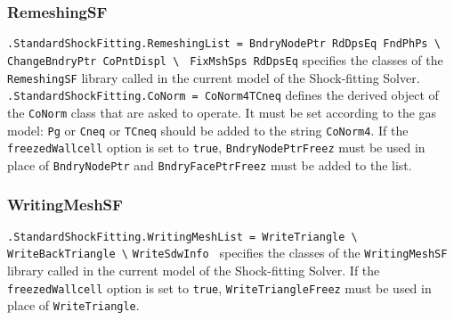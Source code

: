 \documentclass[11pt,a4paper,oneside]{article}
\begin{document}
\subsubsection*{RemeshingSF}

\hspace*{1cm} \texttt{.StandardShockFitting.RemeshingList = BndryNodePtr RdDpsEq FndPhPs
\textbackslash{}}
\newline
\hspace*{8.6cm} \texttt{ChangeBndryPtr CoPntDispl \textbackslash{}}
\newline
\hspace*{8.6cm}\texttt{ FixMshSps RdDpsEq}
\newline
\newline
specifies the classes of the \texttt{RemeshingSF} library called in the current model of the Shock-fitting Solver.
\newline
\newline
\hspace*{1cm} \texttt{.StandardShockFitting.CoNorm = CoNorm4TCneq}
\newline
\newline
defines the derived object of the \texttt{CoNorm} class that are asked to operate. It must be set according to the gas model: \texttt{Pg} or \texttt{Cneq} or \texttt{TCneq} should be added to the string \texttt{CoNorm4}.
\newline
If the \texttt{freezedWallcell} option is set to \texttt{true}, \texttt{BndryNodePtrFreez} must be used in place of \texttt{BndryNodePtr} and \texttt{BndryFacePtrFreez} must be added to the list.

\subsubsection*{WritingMeshSF}

\hspace*{1cm} \texttt{.StandardShockFitting.WritingMeshList = WriteTriangle \textbackslash{}}
\newline
\hspace*{9cm} \texttt{WriteBackTriangle \textbackslash{}}
\newline
\hspace*{9cm} \texttt{WriteSdwInfo }
\newline
\newline
specifies the classes of the \texttt{WritingMeshSF} library called in the current model of the Shock-fitting Solver.
\newline
If the \texttt{freezedWallcell} option is set to \texttt{true}, \texttt{WriteTriangleFreez} must be used in place of \texttt{WriteTriangle}.
\end{document}
